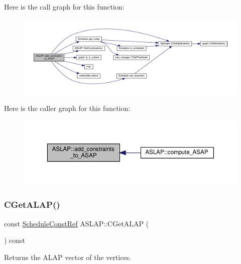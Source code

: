Here is the call graph for this function\+:
\nopagebreak
\begin{figure}[H]
\begin{center}
\leavevmode
\includegraphics[width=350pt]{d9/d2a/classASLAP_a1329f2184152a6e5d403a3d82c2a0ca0_cgraph}
\end{center}
\end{figure}
Here is the caller graph for this function\+:
\nopagebreak
\begin{figure}[H]
\begin{center}
\leavevmode
\includegraphics[width=350pt]{d9/d2a/classASLAP_a1329f2184152a6e5d403a3d82c2a0ca0_icgraph}
\end{center}
\end{figure}
\mbox{\label{classASLAP_a294d0c4ba3226198f1a4b25881ab7653}} 
\subsubsection{\texorpdfstring{C\+Get\+A\+L\+A\+P()}{CGetALAP()}}
{\footnotesize\ttfamily const \hyperlink{schedule_8hpp_a85e4dea8a1611026193d8ca13fc5a260}{Schedule\+Const\+Ref} A\+S\+L\+A\+P\+::\+C\+Get\+A\+L\+AP (\begin{DoxyParamCaption}{ }\end{DoxyParamCaption}) const\hspace{0.3cm}{\ttfamily [inline]}}



Returns the A\+L\+AP vector of the vertices. 

